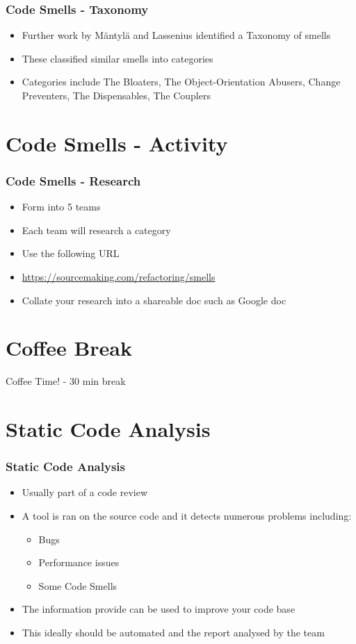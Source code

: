 \begin{frame}
\begin{frame}
\frametitle{Code Smells - Taxonomy}
\begin{itemize}
	\item Further work by M{\"a}ntyl{\"a} and Lassenius identified a Taxonomy of smells
	\item These classified similar smells into categories
	\item Categories include The Bloaters, The Object-Orientation Abusers, Change Preventers, The Dispensables, The Couplers 
\end{itemize}
\end{frame}

\section{Code Smells - Activity}

\begin{frame}
	\frametitle{Code Smells - Research}
	\begin{itemize}
		\item Form into 5 teams
		\item Each team will research a category
		\item Use the following URL
		\item \url{https://sourcemaking.com/refactoring/smells}
		\item Collate your research into a shareable doc such as Google doc
	\end{itemize}
\end{frame}

\section{Coffee Break}
\begin{frame}
	\begin{center}
		Coffee Time! - 30 min break
	\end{center}
\end{frame}

\section{Static Code Analysis}

\begin{frame}
	\frametitle{Static Code Analysis}
	\begin{itemize}
		\item Usually part of a code review
		\item A tool is ran on the source code and it detects numerous problems including:
		\begin{itemize}
			\item Bugs
			\item Performance issues
			\item Some Code Smells
		\end{itemize}
		\item The information provide can be used to improve your code base
		\item This ideally should be automated and the report analysed by the team
	\end{itemize}
\end{frame}


\end{frame}
